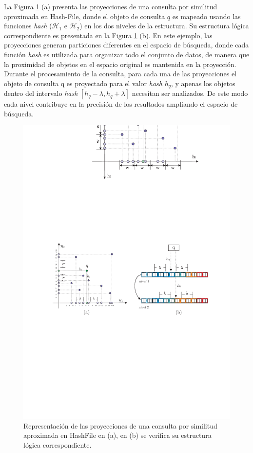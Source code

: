 La Figura \ref{fig:cuda_NN_search} (a) presenta las proyecciones de una consulta por similitud aproximada en Hash-File, donde el objeto de consulta $q$ es mapeado usando las funciones \textit{hash} ($\mathcal{H}_1$ e $\mathcal{H}_2$) en los dos niveles de la estructura. Su estructura lógica correspondiente es presentada en la Figura \ref{fig:cuda_NN_search} (b). En este ejemplo, las proyecciones generan particiones diferentes en el espacio de búsqueda, donde cada función \textit{hash} es utilizada para organizar todo el conjunto de datos, de manera que la proximidad de objetos en el espacio original es mantenida en la proyección. Durante el procesamiento de la consulta, para cada una de las proyecciones el objeto de consulta q es proyectado para el valor \textit{hash} $h_q$, y apenas los objetos dentro del intervalo \textit{hash} $[ h_q - \lambda, h_q + \lambda]$  necesitan ser analizados. De este modo cada nivel contribuye en la precisión de los resultados ampliando el espacio de búsqueda.

\begin{figure}[ht]
 \centering
	\includegraphics[width=0.99\columnwidth]{chapter2/cuda_hashfile.pdf}
 \caption{Representación de las proyecciones de una consulta por similitud aproximada en HashFile en (a), en (b) se verifica su estructura lógica correspondiente.}
 \label{fig:cuda_NN_search}
\end{figure}
  
